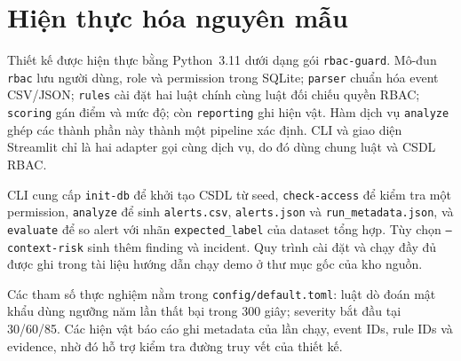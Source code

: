 \section{Hiện thực hóa nguyên mẫu}
\label{sec:implementation}

Thiết kế được hiện thực bằng Python~3.11 dưới dạng gói
\texttt{rbac-guard}. Mô-đun \texttt{rbac} lưu người dùng, role và permission
trong SQLite; \texttt{parser} chuẩn hóa event CSV/JSON; \texttt{rules} cài đặt
hai luật chính cùng luật đối chiếu quyền RBAC; \texttt{scoring} gán điểm và mức
độ; còn \texttt{reporting} ghi hiện vật. Hàm dịch vụ \texttt{analyze} ghép các
thành phần này thành một pipeline xác định. CLI và giao diện Streamlit chỉ là
hai adapter gọi cùng dịch vụ, do đó dùng chung luật và CSDL RBAC.

CLI cung cấp \texttt{init-db} để khởi tạo CSDL từ seed,
\texttt{check-access} để kiểm tra một permission, \texttt{analyze} để sinh
\texttt{alerts.csv}, \texttt{alerts.json} và \texttt{run\_metadata.json}, và
\texttt{evaluate} để so alert với nhãn \texttt{expected\_label} của dataset
tổng hợp. Tùy chọn \texttt{--context-risk} sinh thêm finding và incident.
Quy trình cài đặt và chạy đầy đủ được ghi trong tài liệu hướng dẫn chạy demo ở
thư mục gốc của kho nguồn.

Các tham số thực nghiệm nằm trong \texttt{config/default.toml}: luật dò đoán
mật khẩu dùng ngưỡng năm lần thất bại trong 300 giây; severity bắt đầu tại
30/60/85. Các hiện vật báo cáo ghi metadata của lần chạy, event IDs, rule IDs và
evidence, nhờ đó hỗ trợ kiểm tra đường truy vết của thiết kế.
